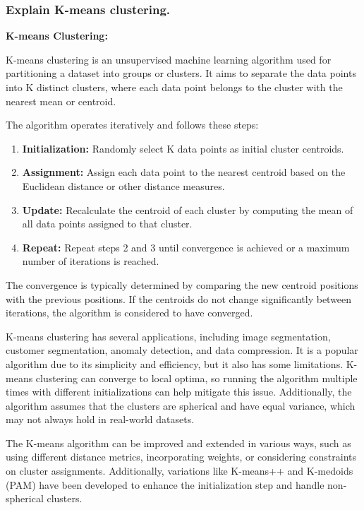 \documentclass{article}
\begin{document}
\subsubsection{Explain K-means clustering.}
\textbf{K-means Clustering:}

K-means clustering is an unsupervised machine learning algorithm used for partitioning a dataset into groups or clusters. It aims to separate the data points into K distinct clusters, where each data point belongs to the cluster with the nearest mean or centroid.

The algorithm operates iteratively and follows these steps:

\begin{enumerate}
    \item \textbf{Initialization:} Randomly select K data points as initial cluster centroids.
    \item \textbf{Assignment:} Assign each data point to the nearest centroid based on the Euclidean distance or other distance measures.
    \item \textbf{Update:} Recalculate the centroid of each cluster by computing the mean of all data points assigned to that cluster.
    \item \textbf{Repeat:} Repeat steps 2 and 3 until convergence is achieved or a maximum number of iterations is reached.
\end{enumerate}

The convergence is typically determined by comparing the new centroid positions with the previous positions. If the centroids do not change significantly between iterations, the algorithm is considered to have converged.

K-means clustering has several applications, including image segmentation, customer segmentation, anomaly detection, and data compression. It is a popular algorithm due to its simplicity and efficiency, but it also has some limitations. K-means clustering can converge to local optima, so running the algorithm multiple times with different initializations can help mitigate this issue. Additionally, the algorithm assumes that the clusters are spherical and have equal variance, which may not always hold in real-world datasets.

The K-means algorithm can be improved and extended in various ways, such as using different distance metrics, incorporating weights, or considering constraints on cluster assignments. Additionally, variations like K-means++ and K-medoids (PAM) have been developed to enhance the initialization step and handle non-spherical clusters.
\end{document}
